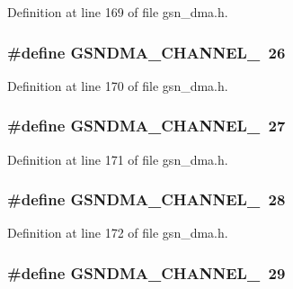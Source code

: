 Definition at line 169 of file gsn\_\-dma.h.

\hypertarget{a00484_aa54c6bfd2061c30275f0e9e55a0fd602}{
\subsubsection[{GSNDMA\_\-CHANNEL\_\-26}]{\setlength{\rightskip}{0pt plus 5cm}\#define GSNDMA\_\-CHANNEL\_~26}}
\label{a00484_aa54c6bfd2061c30275f0e9e55a0fd602}


Definition at line 170 of file gsn\_\-dma.h.

\hypertarget{a00484_a8707844494eee5b22880dd4c6a89b4c2}{
\subsubsection[{GSNDMA\_\-CHANNEL\_\-27}]{\setlength{\rightskip}{0pt plus 5cm}\#define GSNDMA\_\-CHANNEL\_~27}}
\label{a00484_a8707844494eee5b22880dd4c6a89b4c2}


Definition at line 171 of file gsn\_\-dma.h.

\hypertarget{a00484_a76ba60151657aa3b6780b3739640590f}{
\subsubsection[{GSNDMA\_\-CHANNEL\_\-28}]{\setlength{\rightskip}{0pt plus 5cm}\#define GSNDMA\_\-CHANNEL\_~28}}
\label{a00484_a76ba60151657aa3b6780b3739640590f}


Definition at line 172 of file gsn\_\-dma.h.

\hypertarget{a00484_ab28322a6b190c0b4ba882a2aaf1b9a28}{
\subsubsection[{GSNDMA\_\-CHANNEL\_\-29}]{\setlength{\rightskip}{0pt plus 5cm}\#define GSNDMA\_\-CHANNEL\_~29}}
\label{a00484_ab28322a6b190c0b4ba882a2aaf1b9a28}


